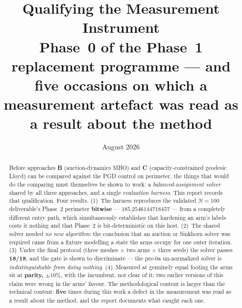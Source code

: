 \documentclass[11pt,a4paper]{article}
\title{\textbf{Qualifying the Measurement Instrument}\\[0.5em]
  \large Phase~0 of the Phase~1 replacement programme --- and five occasions on
  which a measurement artefact was read as a result about the method}
\author{}
\date{August 2026}
\begin{document}
\maketitle

\begin{abstract}
Before approaches \textbf{B} (auction-dynamics MBO) and \textbf{C}
(capacity-constrained geodesic Lloyd) can be compared against the PGD control on
perimeter, the things that would do the comparing must themselves be shown to
work: a \emph{balanced-assignment solver} shared by all three approaches, and a
single \emph{evaluation harness}. This report records that qualification. Four
results. (1)~The harness reproduces the validated \(N{=}100\) deliverable's
Phase~2 perimeter \textbf{bitwise} --- \(185.2546144718457\) --- from a
completely different entry path, which simultaneously establishes that hardening
an arm's labels costs it nothing and that Phase~2 is bit-deterministic on this
host. (2)~The shared solver needed \emph{no new algorithm}: the conclusion that
an auction or Sinkhorn solver was required came from a fixture modelling a state
the arms occupy for one outer iteration. (3)~Under the final protocol
(three meshes \(\times\) two arms \(\times\) three seeds) the solver passes
\textbf{18/18}, and the gate is shown to discriminate --- the pre-0a
un-normalized solver is \emph{indistinguishable from doing nothing}. (4)~Measured
at genuinely equal footing the arms sit at \textbf{parity, \(\pm 10\%\)}, with the
incumbent, not clear of it; two earlier versions of this claim were wrong in the
arms' favour. The methodological content is larger than the technical content:
\textbf{five} times during this work a defect in the measurement was read as a
result about the method, and the report documents what caught each one.
\end{abstract}
\end{document}
